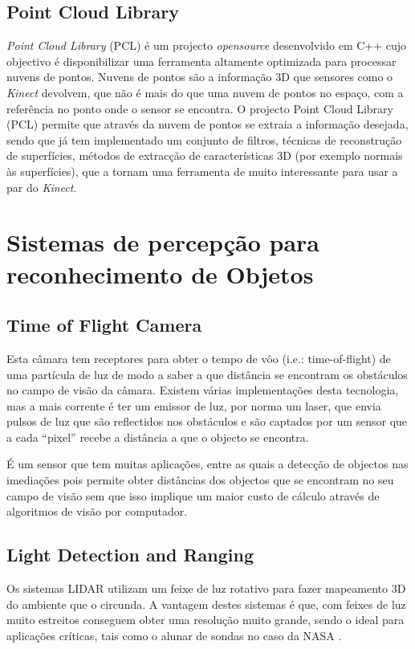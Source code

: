 \subsection{Point Cloud Library}

\emph{Point Cloud Library} (PCL) é um projecto \emph{opensource} desenvolvido em C++ 
cujo objectivo é disponibilizar uma ferramenta altamente optimizada para 
processar nuvens de pontos. Nuvens de pontos são a informação 3D que sensores 
como o \emph{Kinect} devolvem, que não é mais do que uma nuvem de pontos no espaço,
com a referência no ponto onde o sensor se encontra.
O projecto Point Cloud Library (PCL) \cite{Rusu_ICRA2011_PCL} permite que
através da nuvem de pontos se extraia a informação desejada, sendo que
já tem implementado um conjunto de filtros, técnicas de reconstrução de
superfícies, métodos de extracção de características 3D (por exemplo
normais às superfícies), que a tornam uma ferramenta de muito interessante para usar
a par do \emph{Kinect}.

\section{Sistemas de percepção para reconhecimento de Objetos}

\subsection{Time of Flight Camera}
Esta câmara tem receptores para obter o tempo de vôo (i.e.: time-of-flight)
de uma partícula de luz de modo a saber a que distância se encontram os
obstáculos no campo de visão da câmara. Existem várias implementações desta
tecnologia, mas a mais corrente é ter um emissor de luz, por norma um laser,
que envia pulsos de luz que são reflectidos nos obstáculos e são captados por
um sensor que a cada “pixel” recebe a distância a que o objecto se encontra.

É um sensor que tem muitas aplicações, entre as quais a detecção de objectos nas imediações
pois permite obter distâncias dos objectos que se encontram no seu campo
de visão sem que isso implique um maior custo de cálculo através de algoritmos
de visão por computador. 

\subsection[LIDAR]{Light Detection and Ranging}

Os sistemas LIDAR utilizam um feixe de luz rotativo para fazer mapeamento 3D
do ambiente que o circunda. A vantagem destes sistemas é que, com feixes de
luz muito estreitos conseguem obter uma resolução muito grande, sendo o ideal
para aplicações críticas, tais como o alunar de sondas no caso da NASA \cite{Keim2010}.

